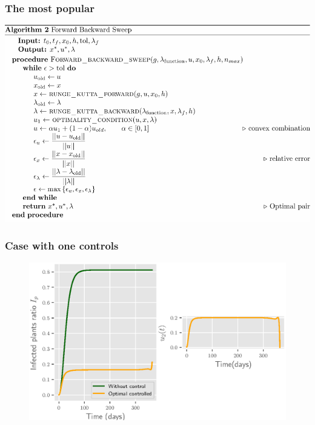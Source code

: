 	\begin{frame}[plain]\frametitle{The most popular}
		\includegraphics[width=1\linewidth]{Feathergraphics/fbs_algorithm.pdf}
	\end{frame}
	
	\begin{frame}[plain]
		\frametitle{Case with one controls}
		\begin{figure}
			\centering	
			\includegraphics[scale=0.5]{Feathergraphics/only_infected_replanting.eps}
		\end{figure}	
	\end{frame}

